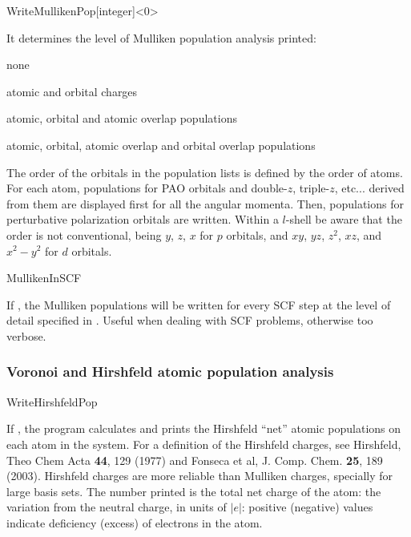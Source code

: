 \begin{fdfentry}{WriteMullikenPop}[integer]<0>
  
  It determines the level of Mulliken population analysis printed:
  \begin{fdfoptions}
    \option[0]%
    none

    \option[1]%
    atomic and orbital charges

    \option[2]%
    atomic, orbital and atomic overlap populations

    \option[3]%
    atomic, orbital, atomic overlap and orbital overlap populations
    
  \end{fdfoptions}
  The order of the orbitals in the population lists is defined by the
  order of atoms. For each atom, populations for PAO orbitals and
  double-$z$, triple-$z$, etc... derived from them are displayed first
  for all the angular momenta. Then, populations for perturbative
  polarization orbitals are written.  Within a $l$-shell be aware that
  the order is not conventional, being $y$, $z$, $x$ for $p$ orbitals,
  and $xy$, $yz$, $z^2$, $xz$, and $x^2-y^2$ for $d$ orbitals.

\end{fdfentry}


\begin{fdflogicalF}{MullikenInSCF}

  If \fdftrue, the Mulliken populations will be written for every SCF
  step at the level of detail specified in
  . Useful when dealing with SCF problems,
  otherwise too verbose.
  
\end{fdflogicalF}



\subsubsection{Voronoi and Hirshfeld atomic population analysis}


\begin{fdflogicalF}{WriteHirshfeldPop}

  If \fdftrue, the program calculates and prints the Hirshfeld ``net''
  atomic populations on each atom in the system. For a definition of
  the Hirshfeld charges, see Hirshfeld, Theo Chem Acta \textbf{44},
  129 (1977) and Fonseca et al, J. Comp. Chem. \textbf{25}, 189
  (2003).  Hirshfeld charges are more reliable than Mulliken charges,
  specially for large basis sets.  The number printed is the total net
  charge of the atom: the variation from the neutral charge, in units
  of $|e|$: positive (negative) values indicate deficiency (excess) of
  electrons in the atom.

\end{fdflogicalF}

